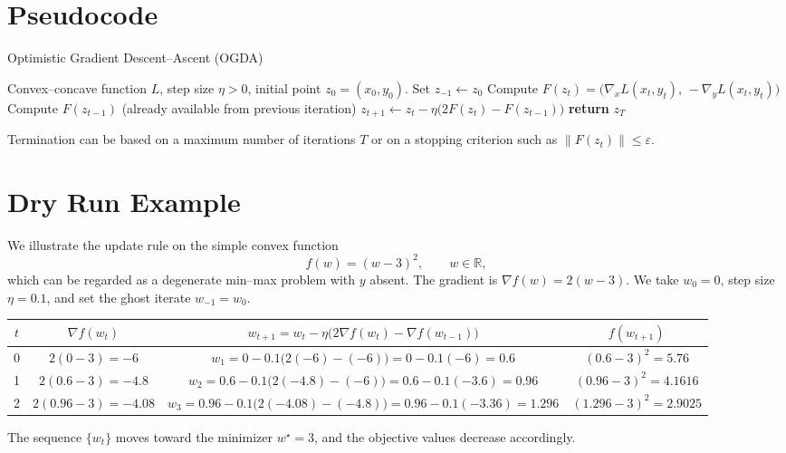 \documentclass[11pt]{article}
\begin{document}
\section*{Pseudocode}
\begin{algorithm}[H]
\caption{Optimistic Gradient Descent–Ascent (OGDA)}\label{alg:ogda}
\begin{algorithmic}[1]
\Require Convex–concave function $L$, step size $\eta>0$, initial point $z_0=(x_0,y_0)$.
\State Set $z_{-1}\gets z_0$ 
    \State Compute $F(z_t)=\big(\nabla_x L(x_t,y_t),\,-\nabla_y L(x_t,y_t)\big)$
    \State Compute $F(z_{t-1})$ (already available from previous iteration)
    \State $z_{t+1}\gets z_t-\eta\big(2F(z_t)-F(z_{t-1})\big)$
\EndFor
\State \textbf{return} $z_T$
\end{algorithmic}
\end{algorithm}
Termination can be based on a maximum number of iterations $T$ or on a stopping criterion such as $\|F(z_t)\|\le\varepsilon$.

\section*{Dry Run Example}
We illustrate the update rule on the simple convex function 
\[
f(w)=(w-3)^2,\qquad w\in\mathbb R,
\]
which can be regarded as a degenerate min–max problem with $y$ absent.  
The gradient is $\nabla f(w)=2(w-3)$.  
We take $w_0=0$, step size $\eta=0.1$, and set the ghost iterate $w_{-1}=w_0$.

\begin{center}
\begin{tabular}{c|c|c|c}
$t$ & $\nabla f(w_t)$ & $w_{t+1}=w_t-\eta\big(2\nabla f(w_t)-\nabla f(w_{t-1})\big)$ & $f(w_{t+1})$\\\hline
0 & $2(0-3)=-6$ & $w_1=0-0.1\big(2(-6)-(-6)\big)=0-0.1(-6)=0.6$ & $(0.6-3)^2=5.76$\\
1 & $2(0.6-3)=-4.8$ & $w_2=0.6-0.1\big(2(-4.8)-(-6)\big)=0.6-0.1(-3.6)=0.96$ & $(0.96-3)^2=4.1616$\\
2 & $2(0.96-3)=-4.08$ & $w_3=0.96-0.1\big(2(-4.08)-(-4.8)\big)=0.96-0.1(-3.36)=1.296$ & $(1.296-3)^2=2.9025$
\end{tabular}
\end{center}
The sequence $\{w_t\}$ moves toward the minimizer $w^{\star}=3$, and the objective values decrease accordingly.

\end{document}
